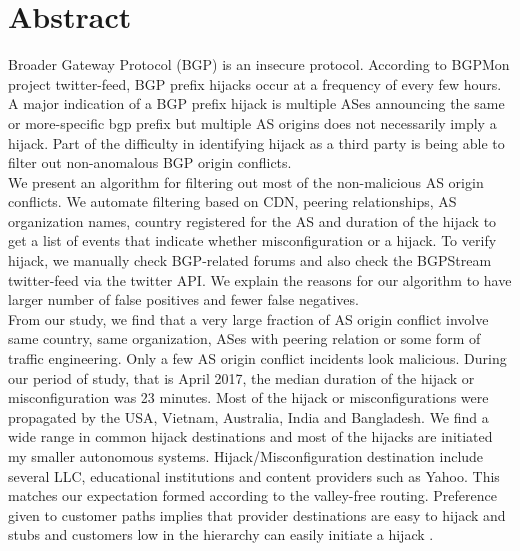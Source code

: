  \section{Abstract}\label{sec:abstract}
Broader Gateway Protocol (BGP) is an insecure protocol. According to BGPMon project twitter-feed, BGP prefix hijacks occur at a frequency of every few hours. A major indication of a BGP prefix hijack is multiple ASes announcing the same or more-specific bgp prefix but multiple AS origins does not necessarily imply a hijack. Part of the difficulty in identifying hijack as a third party is being able to filter out non-anomalous BGP origin conflicts.\\
We present an algorithm for filtering out most of the non-malicious AS origin conflicts. We automate filtering based on CDN, peering relationships, AS organization names, country registered for the AS and duration of the hijack to get a list of events that indicate whether misconfiguration or a hijack. To verify hijack, we manually check BGP-related forums and also check the BGPStream twitter-feed via the twitter API. We explain the reasons for our algorithm to have larger number of false positives and fewer false negatives. \\
From our study, we find that a very large fraction of AS origin conflict involve same country, same organization, ASes with peering relation or some form of traffic engineering. Only a few AS origin conflict incidents look malicious. During our period of study, that is April 2017, the median duration of the hijack or misconfiguration was 23 minutes. Most of the hijack or misconfigurations were propagated by the USA, Vietnam, Australia, India and Bangladesh. We find a wide range in common hijack destinations and most of the hijacks are initiated my smaller autonomous systems.  Hijack/Misconfiguration destination include several LLC, educational institutions and content providers such as Yahoo. This matches our expectation formed according to the valley-free routing. Preference given to customer paths implies that provider destinations are easy to hijack and stubs and  customers low in the hierarchy can easily initiate a hijack .